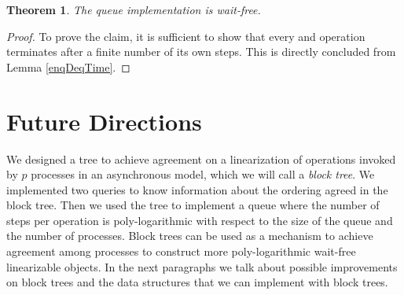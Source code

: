 \documentclass[10pt]{article}
\renewcommand{\it}[1]{\textit{#1}}
\newcommand{\nf}[1]{{\normalfont{\texttt{#1}}}}
\newtheorem{theorem}{Theorem}
\theoremstyle{definition}
\begin{document}
\begin{theorem}
The queue implementation is wait-free.
\end{theorem}
\begin{proof}
To prove the claim, it is sufficient to show that every \nf{Enqueue} and \nf{Dequeue} operation terminates after a finite number of its own steps. This is directly concluded from Lemma \ref{enqDeqTime}.
\end{proof}

\pagebreak
\section{Future Directions}
We designed a tree to achieve agreement on a linearization of operations invoked by $p$ processes in an asynchronous model, which we will call a \it{block tree}. We  implemented two queries to know information about the ordering agreed in the block tree. Then we used the tree to implement a queue where the number of steps per operation is poly-logarithmic with respect to the size of the queue and the number of processes. Block trees can be used as a mechanism to achieve agreement among processes to construct more poly-logarithmic wait-free linearizable objects. In the next paragraphs we talk about possible improvements on block trees and the data structures that we can implement with block trees.
\end{document}
